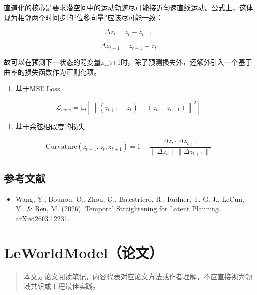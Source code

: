 直道化的核心是要求潜空间中的运动轨迹尽可能接近匀速直线运动。公式上，这体现为相邻两个时间步的``位移向量''应该尽可能一致：

\[
\Delta z_t = z_t - z_{t-1}
\]

\[
\Delta z_{t+1} = z_{t+1} - z_t
\]

故可以在预测下一状态的隐变量z\_t+1时，除了预测损失外，还额外引入一个基于曲率的损失函数作为正则化项。

\begin{enumerate}
\def\labelenumi{\arabic{enumi}.}
\tightlist
\item
  基于MSE Loss
\end{enumerate}

\[
\mathcal{L}_{curv} = \mathbb{E}_t\left[\left\| (z_{t+1}-z_t) - (z_t-z_{t-1}) \right\|^2\right]
\]

\begin{enumerate}
\def\labelenumi{\arabic{enumi}.}
\setcounter{enumi}{1}
\tightlist
\item
  基于余弦相似度的损失
\end{enumerate}

\[
\mathrm{Curvature}(z_{t-1}, z_t, z_{t+1}) = 1 - \frac{\Delta z_t \cdot \Delta z_{t+1}}{\|\Delta z_t\|\,\|\Delta z_{t+1}\|}
\]

\hypertarget{ux53c2ux8003ux6587ux732e-194}{%
\subsection{参考文献}\label{ux53c2ux8003ux6587ux732e-194}}

\begin{itemize}
\tightlist
\item
  Wang, Y., Bounou, O., Zhou, G., Balestriero, R., Rudner, T. G. J., LeCun, Y., \& Ren, M. (2026). \href{https://arxiv.org/abs/2603.12231}{Temporal Straightening for Latent Planning}. arXiv:2603.12231.
\end{itemize}

\clearpage

\hypertarget{leworldmodelux8bbaux6587}{%
\section{LeWorldModel（论文）}\label{leworldmodelux8bbaux6587}}

\begin{quote}
本文是论文阅读笔记，内容代表对应论文方法或作者理解，不应直接视为领域共识或工程最佳实践。
\end{quote}

